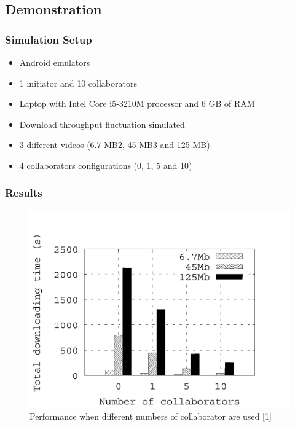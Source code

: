 \documentclass{beamer} %
\begin{document}
\subsection{Demonstration}
\begin{frame}
\frametitle{Simulation Setup}
\begin{itemize}
\item Android emulators
\item 1 initiator and 10 collaborators
\item Laptop with Intel Core i5-3210M processor and 6 GB of RAM
\item Download throughput fluctuation simulated
\item 3 different videos (6.7 MB2, 45 MB3 and 125 MB)
\item 4 collaborators configurations (0, 1, 5 and 10)
\end{itemize}
\end{frame}
\begin{frame}
\frametitle{Results}
\begin{figure}[hbtp]
\centering
\caption{Performance when different numbers of collaborator are used [1]}
\includegraphics[scale=.275]{figures/Results.png}
\end{figure}
\end{frame}
\end{document}
